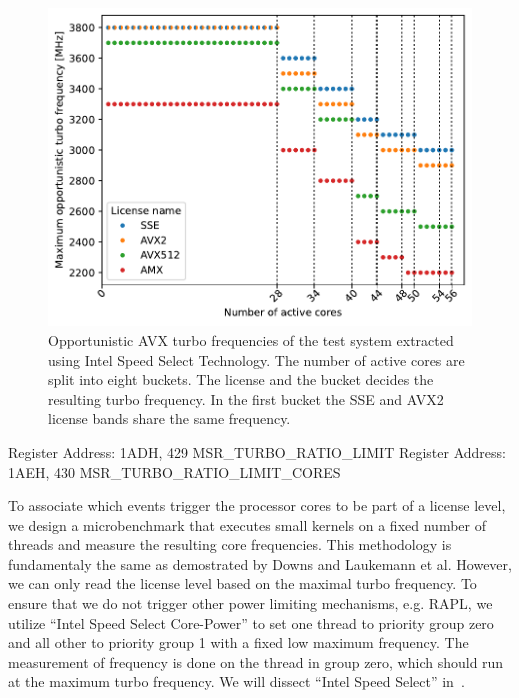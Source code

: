 \begin{figure}[]
    \centering
    \includegraphics[width=0.8\columnwidth]{fig/avx-frequency-license-bands.pdf}
    \caption{\label{fig:p0n-frequencies}Opportunistic AVX turbo frequencies of the test system extracted using Intel Speed Select Technology.
    The number of active cores are split into eight buckets. The license and the bucket decides the resulting turbo frequency.
    In the first bucket the SSE and AVX2 license bands share the same frequency.}
\end{figure}

Register Address: 1ADH, 429 MSR\_TURBO\_RATIO\_LIMIT
Register Address: 1AEH, 430 MSR\_TURBO\_RATIO\_LIMIT\_CORES



To associate which events trigger the processor cores to be part of a license level, we design a microbenchmark that executes small kernels on a fixed number of threads and measure the resulting core frequencies.
This methodology is fundamentaly the same as demostrated by Downs and Laukemann et al.
However, we can only read the license level based on the maximal turbo frequency.
To ensure that we do not trigger other power limiting mechanisms, e.g. RAPL, we utilize ``Intel Speed Select Core-Power'' to set one thread to priority group zero and all other to priority group 1 with a fixed low maximum frequency.
The measurement of frequency is done on the thread in group zero, which should run at the maximum turbo frequency.
We will dissect ``Intel Speed Select'' in~.

